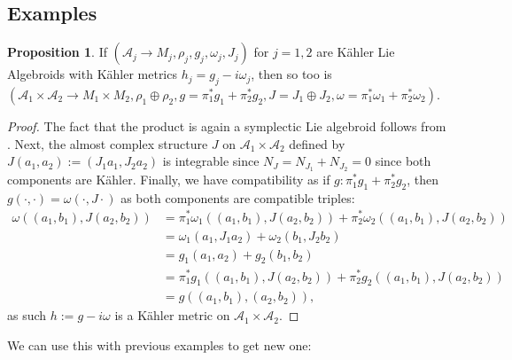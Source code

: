\documentclass{amsart}
\newcommand{\ra}{\rightarrow}
\theoremstyle{definition}
\newtheorem{prop}[theorem]{Proposition}
\newcommand{\A}{\mathcal{A}}
\theoremstyle{definition}
\begin{document}
\subsection{Examples}
\begin{prop}
    If $(\A_j \ra M_j,\rho_j, g_j, \omega_j, J_j)$ for $j =1,2$ are Kähler Lie Algebroids with Kähler metrics $h_j=g_j-i\omega_j$, then so too is $(\A_1 \times \A_2 \ra M_1 \times M_2, \rho_1 \oplus \rho_2, g= \pi_1^*g_1 + \pi_2^*g_2, J = J_1 \oplus J_2, \omega = \pi_1^* \omega_1 + \pi_2^* \omega_2)$.
\end{prop}
\begin{proof}
    The fact that the product is again a symplectic Lie algebroid follows from \cite[Proposition 63]{RANKIN2026102324}. Next, the almost complex structure $J$ on $\A_1 \times \A_2$ defined by $J(a_1,a_2):=(J_1a_1,J_2a_2)$ is integrable since $N_J = N_{J_1}+N_{J_2}=0$ since both components are Kähler. Finally, we have compatibility as if $g:\pi_1^*g_1 + \pi_2^* g_2$, then $g( \cdot ,  \cdot) = \omega ( \cdot , J \cdot)$ as both components are compatible triples:
    \begin{align*}
        \omega((a_1,b_1), J(a_2,b_2)) &= \pi_1^*\omega_1((a_1,b_1), J(a_2,b_2)) + \pi_2^*\omega_2((a_1,b_1), J(a_2,b_2)) \\
        &= \omega_1(a_1, J_1 a_2)+ \omega_2(b_1,J_2b_2) \\
        &= g_1(a_1,a_2) + g_2(b_1,b_2) \\
        &= \pi_1^*g_1((a_1,b_1), J(a_2,b_2)) + \pi_2^* g_2 ((a_1,b_1), J(a_2,b_2)) \\
        &= g((a_1,b_1), (a_2,b_2)),
    \end{align*}
     as such $h := g-i\omega$ is a Kähler metric on $\A_1 \times \A_2$.
\end{proof}
We can use this with previous examples to get new one:
\end{document}

